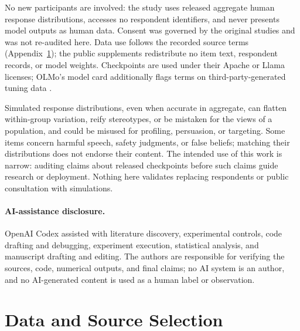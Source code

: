 \documentclass[11pt]{article}
\begin{document}
No new participants are involved: the study uses released aggregate human
response distributions, accesses no respondent identifiers, and never presents
model outputs as human data. Consent was governed by the original studies and
was not re-audited here. Data use follows the recorded source terms
(Appendix~\ref{app:sources}); the public supplements redistribute no item
text, respondent records, or model weights. Checkpoints are used under their
Apache or Llama licenses; OLMo's model card additionally flags terms on
third-party-generated tuning data \cite{olmo2-instruct-model-card}.

Simulated response distributions, even when accurate in aggregate, can flatten
within-group variation, reify stereotypes, or be mistaken for the views of a
population, and could be misused for profiling, persuasion, or targeting. Some
items concern harmful speech, safety judgments, or false beliefs; matching
their distributions does not endorse their content. The intended use of this
work is narrow: auditing claims about released checkpoints before such claims
guide research or deployment. Nothing here validates replacing respondents or
public consultation with simulations.

\paragraph{AI-assistance disclosure.}
OpenAI Codex assisted with literature discovery, experimental controls, code
drafting and debugging, experiment execution, statistical analysis, and
manuscript drafting and editing. The authors are responsible for verifying
the sources, code, numerical outputs, and final claims; no AI system is an
author, and no AI-generated content is used as a human label or observation.



\appendix

\section{Data and Source Selection}
\label{app:sources}
\end{document}
